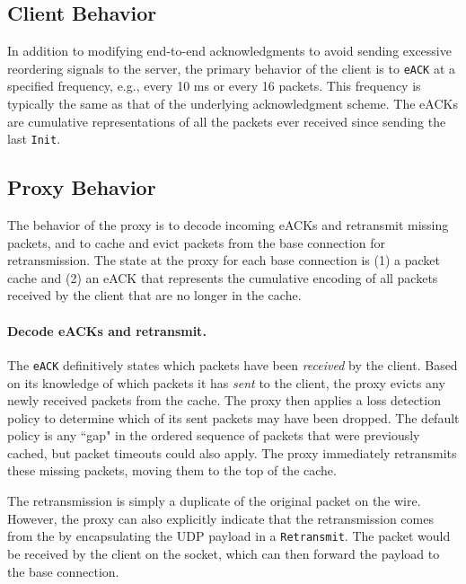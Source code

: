 \subsection{Client Behavior}

In addition to modifying end-to-end acknowledgments to avoid sending excessive
reordering signals to the server, the primary behavior of the client is
to \texttt{eACK} at a specified frequency, e.g., every 10 ms or every 16
packets. This frequency is typically the same as that of the underlying
acknowledgment scheme. The eACKs are cumulative representations of all the
packets ever received since sending the last \texttt{Init}.


\subsection{Proxy Behavior}
\label{sec:packrat-protocol:proxy-behavior}

The behavior of the proxy is to decode incoming eACKs and retransmit missing
packets, and to cache and evict packets from the base connection for
retransmission. The state at the proxy for each base connection is (1) a packet
cache and (2) an eACK that represents the cumulative encoding of all packets
received by the client that are no longer in the cache.

\paragraph{Decode eACKs and retransmit.}

The \texttt{eACK} definitively states which packets have been \textit{received}
by the client. Based on its knowledge of which packets it has \textit{sent} to
the client, the proxy evicts any newly received packets from the cache. The
proxy then applies a loss detection policy to determine which of its sent
packets may have been dropped. The default
policy is any ``gap" in the ordered sequence of packets that were previously
cached, but packet timeouts could also apply. The proxy immediately retransmits
these missing packets, moving them to the top of the cache.

The retransmission is simply a duplicate of the original packet on the wire.
However, the proxy can also explicitly indicate that the retransmission comes
from the \Sys by encapsulating the UDP payload in a \texttt{Retransmit}. The
packet would be received by the client on the \Sys socket, which can then forward
the payload to the base connection.

